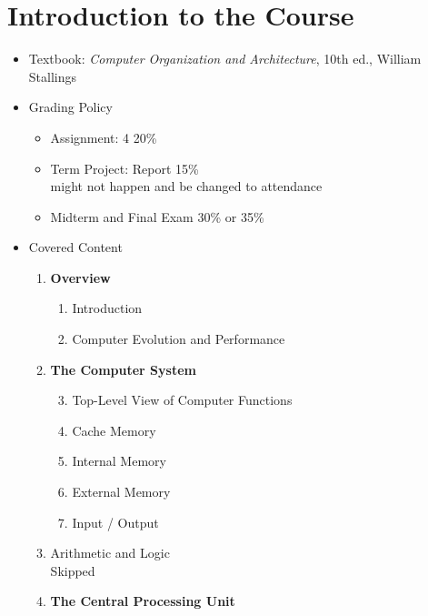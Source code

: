 
\setcounter{chapter}{-1}
\chapter{Introduction to the Course}

\begin{itemize}
    \item Textbook: \emph{Computer Organization and Architecture}, 10th ed., William Stallings
    \item Grading Policy
    \begin{itemize}
        \item Assignment: 4 20\%
        \item Term Project: Report 15\% \\
            might not happen and be changed to attendance
        \item Midterm and Final Exam 30\% or 35\%
    \end{itemize}
    \item Covered Content
    \begin{enumerate}
        \item \textbf{Overview}
        \begin{enumerate}[label = Ch. \arabic*:, labelindent=0pt, itemindent=1em, leftmargin=2em]
            \setcounter{enumii}{0}
            \item Introduction
            \item Computer Evolution and Performance
        \end{enumerate}
        \item \textbf{The Computer System}
        \begin{enumerate}[label = Ch. \arabic*:, labelindent=0pt, itemindent=1em, leftmargin=2em]
            \setcounter{enumii}{2}
            \item Top-Level View of Computer Functions
            \item Cache Memory
            \item Internal Memory
            \item External Memory
            \item Input / Output
        \end{enumerate}
        \item Arithmetic and Logic \\
            Skipped
        \item \textbf{The Central Processing Unit}
        \begin{enumerate}[label = Ch. \arabic*:, labelindent=0pt, itemindent=1em, leftmargin=2em]

\end{enumerate}
\end{enumerate}
\end{itemize}
